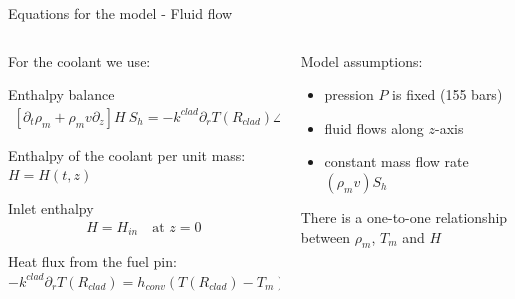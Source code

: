 \begin{frame}{Equations for the model - Fluid flow}

  \tiny

  \begin{columns}
  \begin{column}{8cm}

    For the coolant we use:

    \begin{block}{Enthalpy balance}
      \begin{align}
        \left[ \partial_{t} \rho_{m} 
        + \rho_{m} v \partial_{z} \right] H\ S_{h}
        = - k^{clad} \partial_{r} T (R_{clad}) \Delta z\ 2 \pi R_{clad} \nonumber
      \end{align}
    \end{block}

    Enthalpy of the coolant per unit mass: $ H = H(t,z) $

    \begin{block}{Inlet enthalpy}
      \begin{align}
        H = H_{in} \quad \mbox{at } z = 0 \nonumber
      \end{align}
    \end{block}

  Heat flux from the fuel pin: $ - k^{clad} \partial_{r} T (R_{clad}) = h_{conv} \left( T (R_{clad}) - T_{m} \right) $
  \end{column}

  \begin{column}{4cm}

    Model assumptions:
    \begin{itemize}
    \item pression $ P $ is fixed (155 bars)
    \item fluid flows along $z$-axis
    \item constant mass flow rate $ (\rho_{m} v) S_{h} $
    \end{itemize}

    \vspace{.5cm}

    There is a one-to-one relationship between $ \rho_{m} $, $ T_{m} $ and $ H $

  \end{column}
  \end{columns}

\end{frame}



